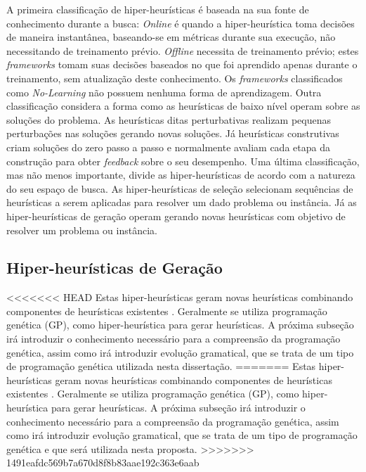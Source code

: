 A primeira classificação de hiper-heurísticas é baseada na sua fonte de conhecimento durante a busca: \textit{Online} é quando a hiper-heurística toma decisões de maneira instantânea, baseando-se em métricas durante sua execução, não necessitando de treinamento prévio. \textit{Offline} necessita de treinamento prévio; estes \textit{frameworks}  tomam suas decisões baseados no que foi aprendido apenas durante o treinamento, sem atualização deste conhecimento. Os \textit{frameworks} classificados como \textit{No-Learning} não possuem nenhuma forma de aprendizagem. Outra classificação considera a forma como as heurísticas de baixo nível operam sobre as soluções do problema. As heurísticas ditas perturbativas realizam pequenas perturbações nas soluções gerando novas soluções. Já heurísticas construtivas criam soluções do zero passo a passo e normalmente avaliam cada etapa da construção para obter \textit{feedback} sobre o seu desempenho. Uma última  classificação, mas não menos importante, divide as hiper-heurísticas de acordo com a  natureza do seu espaço de busca. As hiper-heurísticas de seleção selecionam sequências de heurísticas a serem aplicadas para resolver um dado problema ou instância. Já as hiper-heurísticas de geração operam gerando novas heurísticas com objetivo de resolver um problema ou instância.


\subsection{Hiper-heurísticas de Geração}
\label{Hiper-Heuristicas-Geraçao}

<<<<<<< HEAD
Estas hiper-heurísticas geram novas heurísticas combinando componentes de heurísticas existentes \cite{burke2013hyper}. Geralmente se utiliza programação genética (GP), como hiper-heurística para gerar heurísticas. A próxima subseção irá introduzir o conhecimento necessário para a compreensão da programação genética, assim como irá introduzir evolução gramatical, que se trata de um tipo de programação genética utilizada nesta dissertação.
=======
Estas hiper-heurísticas geram novas heurísticas combinando componentes de heurísticas existentes \cite{burke2013hyper}. Geralmente se utiliza programação genética (GP), como hiper-heurística para gerar heurísticas. A próxima subseção irá introduzir o conhecimento necessário para a compreensão da programação genética, assim como irá introduzir evolução gramatical, que se trata de um tipo de programação genética e que será utilizada nesta proposta.
>>>>>>> 1491eafdc569b7a670d8f8b83aae192c363e6aab

